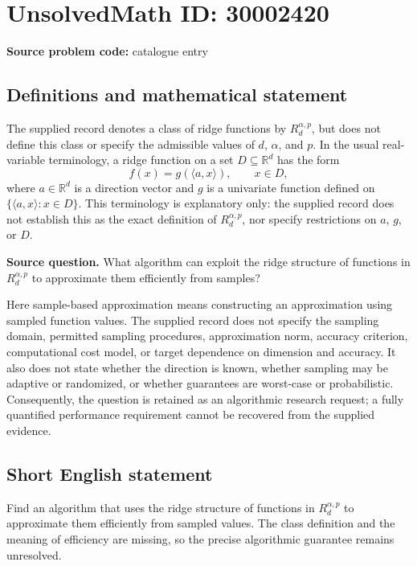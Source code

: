 \documentclass[11pt]{article}
\newcommand{\R}{\mathbb{R}}
\begin{document}
\section*{UnsolvedMath ID: 30002420}
\textbf{Source problem code:} catalogue entry
\subsection{Definitions and mathematical statement}
The supplied record denotes a class of ridge functions by \(R_d^{\alpha,p}\), but does not define this class or specify the admissible values of \(d\), \(\alpha\), and \(p\). In the usual real-variable terminology, a ridge function on a set \(D\subseteq\R^d\) has the form
\[
f(x)=g(\langle a,x\rangle),\qquad x\in D,
\]
where \(a\in\R^d\) is a direction vector and \(g\) is a univariate function defined on \(\{\langle a,x\rangle:x\in D\}\). This terminology is explanatory only: the supplied record does not establish this as the exact definition of \(R_d^{\alpha,p}\), nor specify restrictions on \(a\), \(g\), or \(D\).

\textbf{Source question.} What algorithm can exploit the ridge structure of functions in \(R_d^{\alpha,p}\) to approximate them efficiently from samples?

Here sample-based approximation means constructing an approximation using sampled function values. The supplied record does not specify the sampling domain, permitted sampling procedures, approximation norm, accuracy criterion, computational cost model, or target dependence on dimension and accuracy. It also does not state whether the direction is known, whether sampling may be adaptive or randomized, or whether guarantees are worst-case or probabilistic. Consequently, the question is retained as an algorithmic research request; a fully quantified performance requirement cannot be recovered from the supplied evidence.
\subsection{Short English statement}
Find an algorithm that uses the ridge structure of functions in \(R_d^{\alpha,p}\) to approximate them efficiently from sampled values. The class definition and the meaning of efficiency are missing, so the precise algorithmic guarantee remains unresolved.
\end{document}
